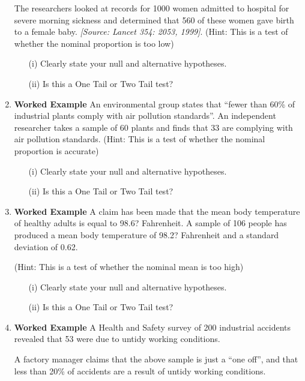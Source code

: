 \documentclass[]{report}
\begin{document}
\begin{enumerate}
	The researchers looked at records for 1000 women admitted to hospital for
	severe morning sickness and determined that 560 of these women gave birth
	to a female baby.  \textit{[Source: Lancet 354: 2053, 1999]}.
	(Hint: This is a test of whether the nominal proportion is too low)
	\begin{itemize}
		\item[(i)] Clearly state your null and alternative hypotheses.
		\item[(ii)] Is this a One Tail or Two Tail test?
	\end{itemize}
	\item \textbf{Worked Example}
	An environmental group states that “fewer than 60\% of industrial plants comply with air pollution standards”. An independent researcher takes a sample of 60 plants and finds that 33 are complying with air pollution standards. 
	(Hint: This is a test of whether the nominal proportion is accurate)
	\begin{itemize}
		\item[(i)] Clearly state your null and alternative hypotheses.
		\item[(ii)] Is this a One Tail or Two Tail test?
	\end{itemize}
	
	\item \textbf{Worked Example}
	A claim has been made that the mean body temperature of healthy adults is equal to 98.6? Fahrenheit. A sample of 106 people has produced a mean body temperature of 98.2? Fahrenheit and a standard deviation of 0.62. 
	
	(Hint: This is a test of whether the nominal mean is too high)
	\begin{itemize}
		\item[(i)] Clearly state your null and alternative hypotheses.
		\item[(ii)] Is this a One Tail or Two Tail test?
	\end{itemize}
	
	\item \textbf{Worked Example}
	A Health and Safety survey of 200 industrial accidents revealed that 53 
	were due to untidy working conditions.  
	
	A factory manager claims that the above sample is just a “one off”, and that less than 20\% of accidents are a result of untidy working conditions. 
	

\end{enumerate}
\end{document}
